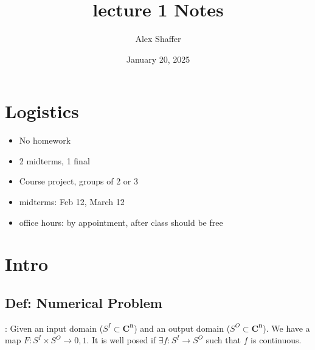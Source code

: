 \documentclass{article}
\title{lecture 1 Notes}
\author{Alex Shaffer}
\date{January 20, 2025}
\begin{document}
\maketitle

\section{Logistics}
\begin{itemize}
    \item No homework
    \item 2 midterms, 1 final
    \item Course project, groups of 2 or 3
    \item midterms: Feb 12, March 12
    \item office hours: by appointment, after class should be free
\end{itemize}

\section{Intro}

\subsection{Def: Numerical Problem}:
Given an input domain ($S^I \subset \mathbf{C^n}$) and an output domain ($S^O \subset \mathbf{C^n}$).
We have a map $F: S^I \times S^O \to {0, 1}$.
It is well posed if $\exists f: S^I \to S^O$ such that $f$ is continuous.
\end{document}
